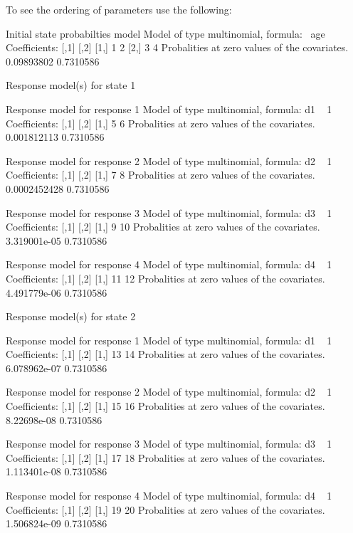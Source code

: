 \documentclass[article]{jss}
\begin{document}
To see the ordering of parameters use the following:
\begin{Schunk}
\begin{Soutput}
Initial state probabilties model 
Model of type multinomial, formula: ~age
Coefficients: 
     [,1] [,2]
[1,]    1    2
[2,]    3    4
Probalities at zero values of the covariates.
0.09893802 0.7310586 

Response model(s) for state 1 

Response model for response 1 
Model of type multinomial, formula: d1 ~ 1
Coefficients: 
     [,1] [,2]
[1,]    5    6
Probalities at zero values of the covariates.
0.001812113 0.7310586 

Response model for response 2 
Model of type multinomial, formula: d2 ~ 1
Coefficients: 
     [,1] [,2]
[1,]    7    8
Probalities at zero values of the covariates.
0.0002452428 0.7310586 

Response model for response 3 
Model of type multinomial, formula: d3 ~ 1
Coefficients: 
     [,1] [,2]
[1,]    9   10
Probalities at zero values of the covariates.
3.319001e-05 0.7310586 

Response model for response 4 
Model of type multinomial, formula: d4 ~ 1
Coefficients: 
     [,1] [,2]
[1,]   11   12
Probalities at zero values of the covariates.
4.491779e-06 0.7310586 


Response model(s) for state 2 

Response model for response 1 
Model of type multinomial, formula: d1 ~ 1
Coefficients: 
     [,1] [,2]
[1,]   13   14
Probalities at zero values of the covariates.
6.078962e-07 0.7310586 

Response model for response 2 
Model of type multinomial, formula: d2 ~ 1
Coefficients: 
     [,1] [,2]
[1,]   15   16
Probalities at zero values of the covariates.
8.22698e-08 0.7310586 

Response model for response 3 
Model of type multinomial, formula: d3 ~ 1
Coefficients: 
     [,1] [,2]
[1,]   17   18
Probalities at zero values of the covariates.
1.113401e-08 0.7310586 

Response model for response 4 
Model of type multinomial, formula: d4 ~ 1
Coefficients: 
     [,1] [,2]
[1,]   19   20
Probalities at zero values of the covariates.
1.506824e-09 0.7310586 
\end{Soutput}
\end{Schunk}
\end{document}
